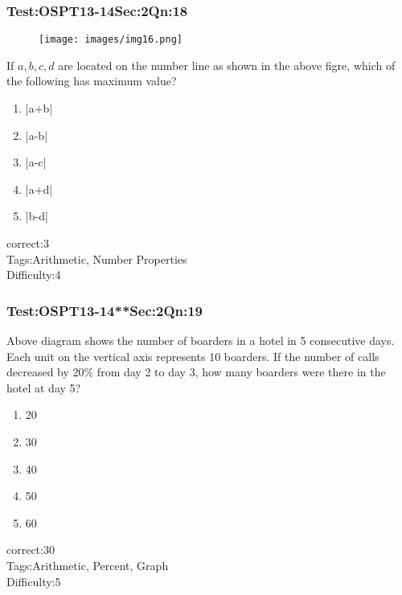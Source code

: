 \documentclass[]{beamer}
\begin{document}
    \begin{frame}
	    \frametitle{Test:OSPT13-14\hspace{2mm}Sec:2\hspace{2mm}Qn:18}
	    \begin{figure}
	    \begin{center}
	    \texttt{[image: images/img16.png]}
	    \end{center}
	    \end{figure}
	    If $a,b,c,d$ are located on the number line as shown in the above figre, which of the following has maximum value?
	   \begin{enumerate}
	        \item
	           |a+b|
	        \item
	            |a-b|
	        \item
	           |a-c|
	        \item
	            |a+d|
	        \item
	           |b-d|
	    \end{enumerate}
	    correct:3\\   
	    Tags:Arithmetic, Number Properties \\
	    Difficulty:4   \\
    \end{frame}    
    \begin{frame}
	    \frametitle{Test:OSPT13-14**\hspace{2mm}Sec:2\hspace{2mm}Qn:19}
	    Above diagram shows the number of boarders in a hotel in 5 consecutive days. Each unit on the vertical axis represents 10 boarders. If the number of calls decreased by 20\% from day 2 to  day 3, how many boarders were there in the hotel at day 5?
	   \begin{enumerate}
	        \item
	           20
	        \item
	            30
	        \item
	           40
	        \item
	            50
	        \item
	           60
	    \end{enumerate}
	    correct:30\\   
	    Tags:Arithmetic, Percent, Graph \\
	    Difficulty:5   \\
    \end{frame}    
\end{document}
